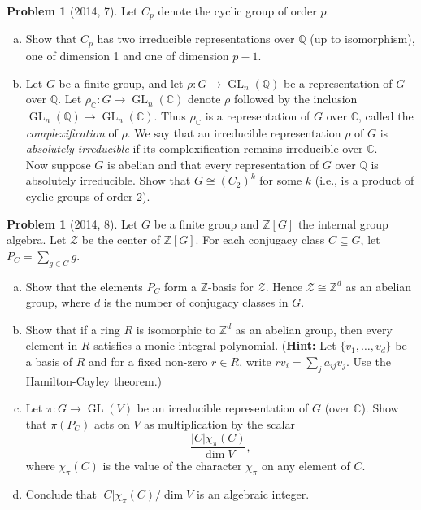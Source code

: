 \documentclass{article}
\newcommand{\<}{\langle} %
\renewcommand{\>}{\rangle} %
\DeclareMathOperator{\GL}{GL}
\theoremstyle{plain}
\theoremstyle{remark}
\theoremstyle{definition}
\newtheorem{examproblem}[equation]{Problem}
\begin{document}
\begin{examproblem}[2014, 7]
	Let $C_p$ denote the cyclic group of order $p$.
	\begin{enumerate}[(a)]
		\item Show that $C_p$ has two irreducible representations over
			$\mathbb Q$ (up to isomorphism), one of dimension 1
			and one of dimension $p-1$.
		\item Let $G$ be a finite group, and let $\rho:G\rightarrow
			\GL_n(\mathbb Q)$ be a representation of $G$ over $\mathbb Q$.
			Let $\rho_{\mathbb C}:G\rightarrow\GL_n(\mathbb C)$ denote
			$\rho$ followed by the inclusion $\GL_n(\mathbb Q)\rightarrow
			\GL_n(\mathbb C)$. Thus $\rho_{\mathbb C}$ is a representation
			of $G$ over $\mathbb C$, called the \textit{complexification}
			of $\rho$. We say that an irreducible representation $\rho$
			of $G$ is \textit{absolutely irreducible} if its
			complexification remains irreducible over $\mathbb C$.\\
			Now suppose $G$ is abelian and that every representation
			of $G$ over $\mathbb Q$ is absolutely irreducible. Show that
			$G\cong(C_2)^k$ for some $k$ (i.e., is a product of
			cyclic groups of order 2).
	\end{enumerate}
\end{examproblem}

\begin{examproblem}[2014, 8]
	Let $G$ be a finite group and $\mathbb Z[G]$ the internal group algebra.
	Let $\mathcal Z$ be the center of $\mathbb Z[G]$. For each conjugacy class
	$C\subseteq G$, let $P_C=\sum_{g\in C}g$.
	\begin{enumerate}[(a)]
		\item Show that the elements $P_C$ form a $\mathbb Z$-basis for
			$\mathcal Z$. Hence $\mathcal Z\cong\mathbb Z^d$ as an
			abelian group, where $d$ is the number of
			conjugacy classes in $G$.
		\item Show that if a ring $R$ is isomorphic to $\mathbb Z^d$ as
			an abelian group, then every element in $R$ satisfies
			a monic integral polynomial.
			(\textbf{Hint:} Let $\{v_1,\dots,v_d\}$ be a basis of
			$R$ and for a fixed non-zero $r\in R$, write $rv_i=\sum_j
			a_{ij}v_j$. Use the Hamilton-Cayley theorem.)
		\item Let $\pi:G\rightarrow\GL(V)$ be an irreducible representation
			of $G$ (over $\mathbb C$). Show that $\pi(P_C)$ acts on $V$
			as multiplication by the scalar
			$$
			\frac{|C|\chi_{\pi}(C)}{\dim V},
			$$
			where $\chi_{\pi}(C)$ is the value of the character
			$\chi_{\pi}$ on any element of $C$.
		\item Conclude that $|C|\chi_{\pi}(C)/\dim V$ is an algebraic
			integer.
	\end{enumerate}
\end{examproblem}
\end{document}
